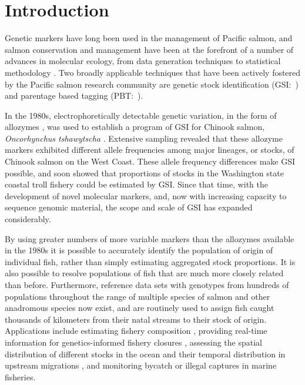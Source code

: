 
\section*{Introduction}

Genetic markers have long been used in the
management of Pacific salmon, and salmon conservation and management have been
at the forefront of a number of advances in molecular ecology,
from data generation techniques \citep{clemento2011discovery,campbell2015genotyping,mckinney2017managing,baetscher2018microhaplotypes}
to statistical methodology
\citep{smouse1990genetic,anderson2002model,pella2006gibbs,anderson2010assessing}.
Two broadly applicable techniques that have been
actively fostered by the Pacific salmon research community are genetic
stock identification
(GSI:~\citealt{milner1982genetic,beacham2004dna,seeb2007development})
and parentage based tagging
(PBT:~\citealt{anderson2006power, garza2007large, abadia2013large, steele2013validation}).



 In the 1980s, electrophoretically
detectable genetic variation, in the form of allozymes
\citep{ayala1972allozymes,allendorf1981use}, was used to
establish a program of GSI for Chinook salmon,
{\em Oncorhynchus tshawytscha} \citep{milner1982genetic}.  Extensive sampling
revealed that these allozyme markers
exhibited different allele frequencies among major lineages, or stocks, of Chinook salmon on the West Coast.
These allele frequency differences make GSI possible, and
\citet{milner1985genetic} soon showed that proportions of stocks in
the Washington state coastal troll fishery could be estimated by GSI\@.
Since that time, with the development of novel molecular markers, and, now
with increasing capacity to sequence genomic material, the scope and scale of GSI
has expanded considerably.

By using greater numbers of more variable markers than the allozymes available
in the 1980s it is possible to accurately
identify the population of origin of individual fish, rather than simply estimating
aggregated stock proportions.  It is also possible to resolve populations of fish that
are much more closely related than before.  Furthermore, reference data sets with genotypes
from hundreds of populations throughout the range of multiple species of salmon and
other anadromous species
\citep{seeb2007development,gilbey2018microsatellite,barclay2019genetic} now exist, and are routinely used to assign fish caught thousands of
kilometers from their natal streams to their stock of origin. Applications include estimating fishery
composition \citep{satterthwaite2015stock}, providing real-time information for genetics-informed fishery closures \citep{beacham2004dna}, assessing the spatial distribution of different stocks in the
ocean \citep{urawa2009stock} and their temporal distribution in upstream migrations
\citep{hess2014monitoring},  and monitoring  bycatch \citep{hasselman2016genetic} or illegal captures \citep{wilmot1999origins} in marine fisheries.

